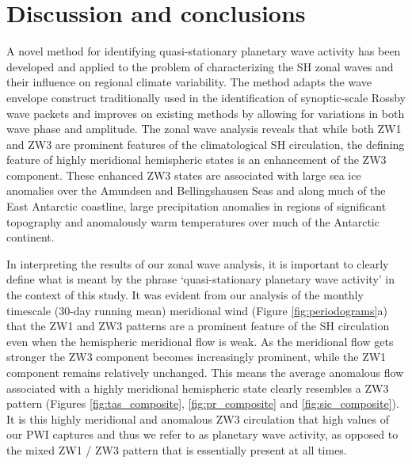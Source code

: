 \section{Discussion and conclusions}

A novel method for identifying quasi-stationary planetary wave activity has been developed and applied to the problem of characterizing the SH zonal waves and their influence on regional climate variability. The method adapts the wave envelope construct traditionally used in the identification of synoptic-scale Rossby wave packets and improves on existing methods by allowing for variations in both wave phase and amplitude. The zonal wave analysis reveals that while both ZW1 and ZW3 are prominent features of the climatological SH circulation, the defining feature of highly meridional hemispheric states is an enhancement of the ZW3 component. These enhanced ZW3 states are associated with large sea ice anomalies over the Amundsen and Bellingshausen Seas and along much of the East Antarctic coastline, large precipitation anomalies in regions of significant topography and anomalously warm temperatures over much of the Antarctic continent. 

In interpreting the results of our zonal wave analysis, it is important to clearly define what is meant by the phrase `quasi-stationary planetary wave activity' in the context of this study. It was evident from our analysis of the monthly timescale (30-day running mean) meridional wind  (Figure \ref{fig:periodograms}a) that the ZW1 and ZW3 patterns are a prominent feature of the SH circulation even when the hemispheric meridional flow is weak. As the meridional flow gets stronger the ZW3 component becomes increasingly prominent, while the ZW1 component remains relatively unchanged. This means the average anomalous flow associated with a highly meridional hemispheric state clearly resembles a ZW3 pattern (Figures \ref{fig:tas_composite}, \ref{fig:pr_composite} and \ref{fig:sic_composite}). It is this highly meridional and anomalous ZW3 circulation that high values of our PWI captures and thus we refer to as planetary wave activity, as opposed to the mixed ZW1 / ZW3 pattern that is essentially present at all times.  

